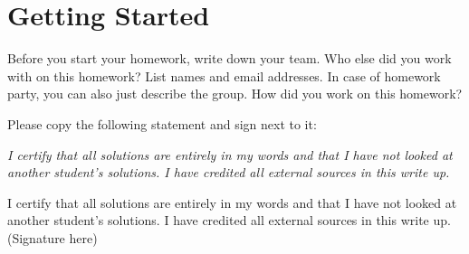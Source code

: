 \documentclass[11pt]{article}
\begin{document}
\maketitle
\fontsize{12}{15}\selectfont

\section{Getting Started}
Before you start your homework, write down your team. Who else did you work with on this homework? List names and email addresses. In case of homework party, you can also just describe the group. How did you work on this homework?

Please copy the following statement and sign next to it:

\textit{I certify that all solutions are entirely in my words and that I have not looked at another student's solutions. I have credited all external sources in this write up.}

\vspace{15pt}
{\color{blue} I certify that all solutions are entirely in my words and that I have not looked at another student's solutions. I have credited all external sources in this write up. (Signature here)}



\end{document}
